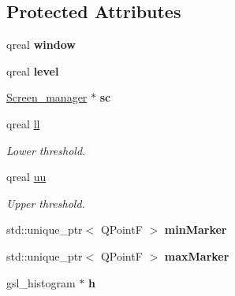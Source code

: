 \subsection*{Protected Attributes}
\begin{DoxyCompactItemize}
\item 
\mbox{\label{classBarScreenWL_a09e670ae9f4ac759f814d9725d732b40}} 
qreal {\bfseries window}
\item 
\mbox{\label{classBarScreenWL_af3ed995aa130039c6bfb5e4ca20f9293}} 
qreal {\bfseries level}
\item 
\mbox{\label{classBarScreen_a78c84b8c40247d7cb011424250d16ba5}} 
\mbox{\hyperlink{classScreen__manager}{Screen\+\_\+manager}} $\ast$ {\bfseries sc}
\item 
\mbox{\label{classBarScreen_a5d3193a8e27fd072ed67f069dac1640b}} 
qreal \mbox{\hyperlink{classBarScreen_a5d3193a8e27fd072ed67f069dac1640b}{ll}}
\begin{DoxyCompactList}\small\item\em Lower threshold. \end{DoxyCompactList}\item 
\mbox{\label{classBarScreen_a3b456d8140f716cfee488091c927d54f}} 
qreal \mbox{\hyperlink{classBarScreen_a3b456d8140f716cfee488091c927d54f}{uu}}
\begin{DoxyCompactList}\small\item\em Upper threshold. \end{DoxyCompactList}\item 
\mbox{\label{classBarScreen_a3d5a447b9895c22cf4e28ea041cef272}} 
std\+::unique\+\_\+ptr$<$ Q\+PointF $>$ {\bfseries min\+Marker}
\item 
\mbox{\label{classBarScreen_a80404aaebe17ccccf1918c8f7b59dc3e}} 
std\+::unique\+\_\+ptr$<$ Q\+PointF $>$ {\bfseries max\+Marker}
\item 
\mbox{\label{classBarScreen_a92a1082b85912224f43a4f2ea85aa289}} 
gsl\+\_\+histogram $\ast$ {\bfseries h}
\item 
\mbox{\label{classBarScreen_ad590da057a164a1d8a5339243165adf7}} 

\end{DoxyCompactItemize}
